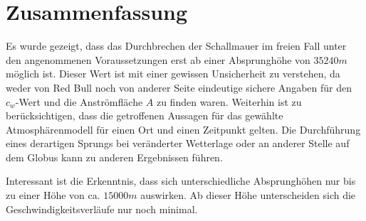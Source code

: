 \section{Zusammenfassung}\label{sec:schluss}

Es wurde gezeigt, dass das Durchbrechen der Schallmauer im freien Fall unter den angenommenen Voraussetzungen erst ab einer Absprunghöhe von $35240m$ möglich ist.
Dieser Wert ist mit einer gewissen Unsicherheit zu verstehen, da weder von Red Bull noch von anderer Seite eindeutige sichere Angaben für den $c_w$-Wert und die Anströmfläche $A$ zu finden waren.
Weiterhin ist zu berücksichtigen, dass die getroffenen Aussagen für das gewählte Atmosphärenmodell für einen Ort und einen Zeitpunkt gelten.
Die Durchführung eines derartigen Sprungs bei veränderter Wetterlage oder an anderer Stelle auf dem Globus kann zu anderen Ergebnissen führen.

Interessant ist die Erkenntnis, dass sich unterschiedliche Absprunghöhen nur bis zu einer Höhe von ca. $15000m$ auswirken.
Ab dieser Höhe unterscheiden sich die Geschwindigkeitsverläufe nur noch minimal.

\newpage
